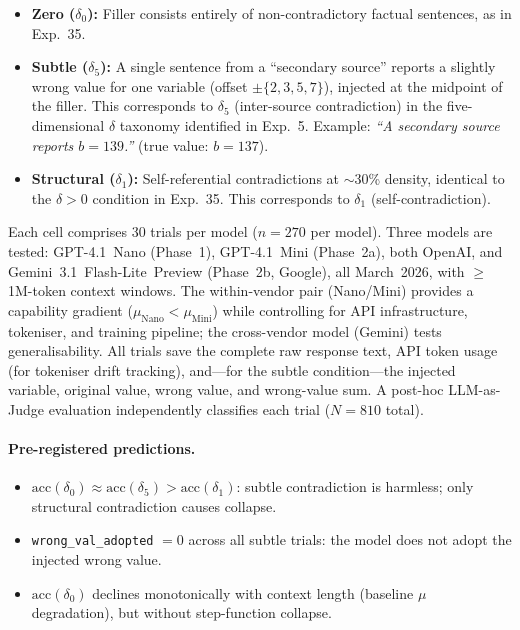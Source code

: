 \documentclass[11pt,a4paper]{article}
\begin{document}
\begin{itemize}
  \item \textbf{Zero ($\delta_0$):} Filler consists entirely of non-contradictory factual sentences, as in Exp.~35.
  \item \textbf{Subtle ($\delta_5$):} A single sentence from a ``secondary source'' reports a slightly wrong value for one variable (offset $\pm\{2,3,5,7\}$), injected at the midpoint of the filler. This corresponds to $\delta_5$ (inter-source contradiction) in the five-dimensional $\delta$ taxonomy identified in Exp.~5. Example: \emph{``A secondary source reports $b = 139$.''} (true value: $b = 137$).
  \item \textbf{Structural ($\delta_1$):} Self-referential contradictions at $\sim$30\% density, identical to the $\delta > 0$ condition in Exp.~35. This corresponds to $\delta_1$ (self-contradiction).
\end{itemize}

Each cell comprises 30 trials per model ($n = 270$ per model). Three models are tested: GPT-4.1~Nano (Phase~1), GPT-4.1~Mini (Phase~2a), both OpenAI, and Gemini~3.1~Flash-Lite~Preview (Phase~2b, Google), all March~2026, with $\geq$1M-token context windows. The within-vendor pair (Nano/Mini) provides a capability gradient ($\mu_{\text{Nano}} < \mu_{\text{Mini}}$) while controlling for API infrastructure, tokeniser, and training pipeline; the cross-vendor model (Gemini) tests generalisability. All trials save the complete raw response text, API token usage (for tokeniser drift tracking), and---for the subtle condition---the injected variable, original value, wrong value, and wrong-value sum. A post-hoc LLM-as-Judge evaluation independently classifies each trial ($N = 810$ total).

\paragraph{Pre-registered predictions.}
\begin{itemize}
  \item[\textbf{P\textsubscript{1}}] $\text{acc}(\delta_0) \approx \text{acc}(\delta_5) > \text{acc}(\delta_1)$: subtle contradiction is harmless; only structural contradiction causes collapse.
  \item[\textbf{P\textsubscript{2}}] \texttt{wrong\_val\_adopted} $= 0$ across all subtle trials: the model does not adopt the injected wrong value.
  \item[\textbf{P\textsubscript{3}}] $\text{acc}(\delta_0)$ declines monotonically with context length (baseline $\mu$ degradation), but without step-function collapse.
\end{itemize}
\end{document}
